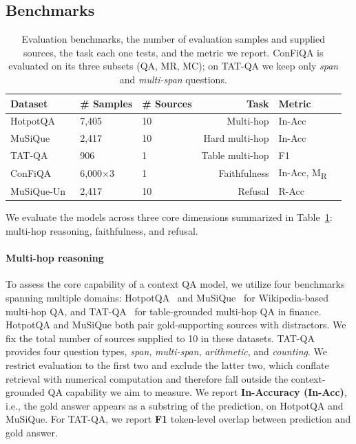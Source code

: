 \documentclass{llmxive}
\begin{document}
\subsection{Benchmarks}
\begin{table}[t!]
\centering
\footnotesize
\begin{tabular}{lllrll}
\toprule
\textbf{Dataset} & \textbf{\# Samples} & \textbf{\# Sources} & \textbf{Task} & \textbf{Metric} \\
\midrule
HotpotQA~\citep{hotpotqa} & 7{,}405 & 10 & Multi-hop & In-Acc \\
MuSiQue~\citep{musique} & 2{,}417 & 10 & Hard multi-hop & In-Acc \\
TAT-QA~\citep{tat-qa} & 906 & 1 & Table multi-hop & F1 \\
ConFiQA~\citep{bi-etal-2025-context} & 6{,}000$\times$3 & 1 & Faithfulness & In-Acc, M\textsubscript{R} \\
MuSiQue-Un~\citep{musique} & 2{,}417 & 10 & Refusal & R-Acc \\
\bottomrule
\end{tabular}
\caption{Evaluation benchmarks, the number of evaluation samples and supplied sources, the task each one tests, and the metric we report. ConFiQA is evaluated on its three subsets (QA, MR, MC); on TAT-QA we keep only \textit{span} and \textit{multi-span} questions.}
\label{tab:benchmarks}
\end{table}

We evaluate the models across three core dimensions summarized in Table~\ref{tab:benchmarks}: multi-hop reasoning, faithfulness, and refusal. 

\paragraph{Multi-hop reasoning} To assess the core capability of a context QA model, we utilize four benchmarks spanning multiple domains: HotpotQA~\citep{hotpotqa} and MuSiQue~\citep{musique} for Wikipedia-based multi-hop QA, and TAT-QA~\citep{tat-qa} for table-grounded multi-hop QA in finance. HotpotQA and MuSiQue both pair gold-supporting sources with distractors. We fix the total number of sources supplied to 10 in these datasets. TAT-QA provides four question types, \textit{span}, \textit{multi-span}, \textit{arithmetic}, and \textit{counting}. We restrict evaluation to the first two and exclude the latter two, which conflate retrieval with numerical computation and therefore fall outside the context-grounded QA capability we aim to measure. We report \textbf{In-Accuracy (In-Acc)}, i.e., the gold answer appears as a substring of the prediction, on HotpotQA and MuSiQue. For TAT-QA, we report \textbf{F1} token-level overlap between prediction and gold answer.
\end{document}
